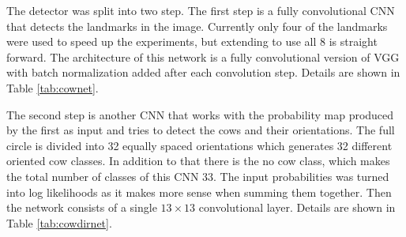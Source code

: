 \documentclass[10pt,a4paper,twocolumn]{article}
\begin{document}
The detector was split into two step. The first step is a fully convolutional CNN that detects the landmarks in the image. Currently only four of the landmarks were used to speed up the experiments, but extending to use all 8 is straight forward. The architecture of this network is a fully convolutional version of VGG \cite{Simonyan14c} with batch normalization \cite{DBLP:journals/corr/IoffeS15} added after each convolution step. Details are shown in Table \ref{tab:cownet}.

The second step is another CNN that works with the probability map produced by the first as input and tries to detect the cows and their orientations. The full circle is divided into 32 equally spaced orientations which generates 32 different oriented cow classes. In addition to that there is the no cow class, which makes the total number of classes of this CNN 33. The input probabilities was turned into log likelihoods as it makes more sense when summing them together. Then the network consists of a single $ 13 \times 13 $ convolutional layer. Details are shown in Table \ref{tab:cowdirnet}.
\end{document}
